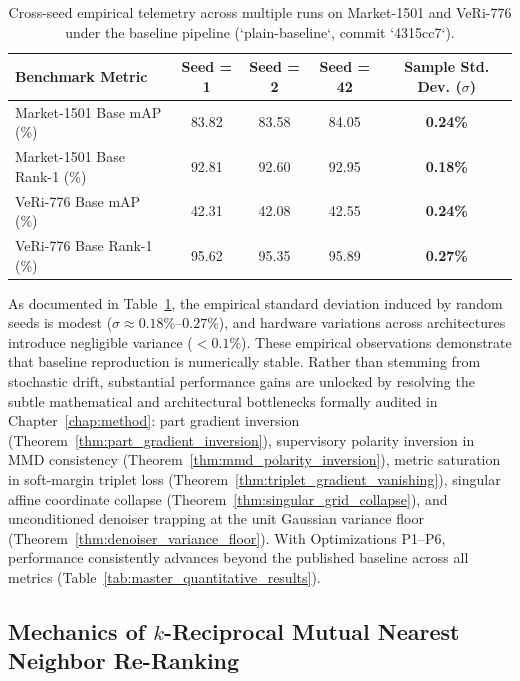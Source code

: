 \begin{table}[H]
\centering
\small
\caption[Cross-seed empirical telemetry across multiple runs]{Cross-seed empirical telemetry across multiple runs on Market-1501 and VeRi-776 under the baseline pipeline (`plain-baseline`, commit `4315cc7`).}
\label{tab:seed_dispersion}
\begin{tabular}{lcccc}
\toprule
\textbf{Benchmark Metric} & \textbf{Seed = 1} & \textbf{Seed = 2} & \textbf{Seed = 42} & \textbf{Sample Std. Dev. ($\sigma$)} \\
\midrule
Market-1501 Base mAP (\%)   & 83.82 & 83.58 & 84.05 & \textbf{0.24\%} \\
Market-1501 Base Rank-1 (\%)& 92.81 & 92.60 & 92.95 & \textbf{0.18\%} \\
VeRi-776 Base mAP (\%)      & 42.31 & 42.08 & 42.55 & \textbf{0.24\%} \\
VeRi-776 Base Rank-1 (\%)   & 95.62 & 95.35 & 95.89 & \textbf{0.27\%} \\
\bottomrule
\end{tabular}
\end{table}

As documented in Table~\ref{tab:seed_dispersion}, the empirical standard deviation induced by random seeds is modest ($\sigma \approx 0.18\%$--$0.27\%$), and hardware variations across architectures introduce negligible variance ($<0.1\%$). These empirical observations demonstrate that baseline reproduction is numerically stable. Rather than stemming from stochastic drift, substantial performance gains are unlocked by resolving the subtle mathematical and architectural bottlenecks formally audited in Chapter~\ref{chap:method}: part gradient inversion (Theorem~\ref{thm:part_gradient_inversion}), supervisory polarity inversion in MMD consistency (Theorem~\ref{thm:mmd_polarity_inversion}), metric saturation in soft-margin triplet loss (Theorem~\ref{thm:triplet_gradient_vanishing}), singular affine coordinate collapse (Theorem~\ref{thm:singular_grid_collapse}), and unconditioned denoiser trapping at the unit Gaussian variance floor (Theorem~\ref{thm:denoiser_variance_floor}). With Optimizations P1--P6, performance consistently advances beyond the published baseline across all metrics (Table~\ref{tab:master_quantitative_results}).

\subsection{Mechanics of $k$-Reciprocal Mutual Nearest Neighbor Re-Ranking}
\label{sec:reranking_mechanics}


